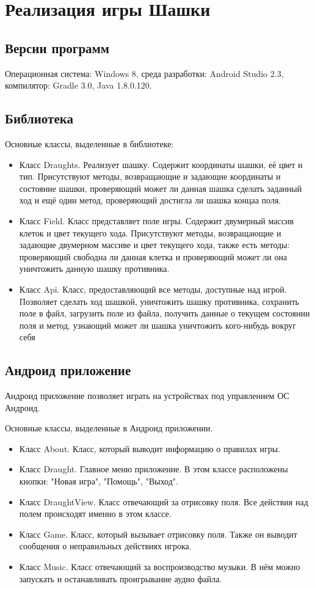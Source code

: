 \documentclass[a4paper]{article}
\begin{document}
\section{Реализация игры Шашки}
\subsection{Версии программ}
Операционная система: Windows 8, среда разработки: Android Studio 2.3, компилятор: Gradle 3.0, Java 1.8.0.120.

\subsection{Библиотека}
\noindent Основные классы, выделенные в библиотеке:
\begin{itemize}
\item Класс Draughts. Реализует шашку. Содержит координаты шашки, её цвет и тип. Присутствуют методы, возвращающие и задающие координаты и состояние шашки, проверяющий может ли данная шашка сделать заданный ход и ещё один метод, проверяющий достигла ли шашка концаа поля.
\item Класс Field. Класс представляет поле игры. Содержит двумерный массив клеток и цвет текущего хода. Присутствуют методы, возвращающие и задающие двумерном массиве и цвет текущего хода, также есть методы: проверяющий свободна ли данная клетка и проверяющий  может ли она уничтожить данную шашку противника.	
\item Класс Api. Класс, предоставляющий все методы, доступные над игрой. Позволяет сделать ход шашкой, уничтожить шашку противника, сохранить поле в файл, загрузить поле из файла, получить данные о текущем состоянии поля и метод, узнающий может ли шашка уничтожить кого-нибудь вокруг себя
\end{itemize}

\subsection{Андроид приложение}
Андроид приложение позволяет играть на устройствах под управлением ОС Андроид.

\noindent Основные классы, выделенные в Андроид приложении. 
\begin{itemize}
\item Класс About. Класс, который выводит информацию о правилах игры.
\item Класс Draught. Главное меню приложение. В этом классе расположены кнопки: "Новая игра", "Помощь", "Выход".
\item Класс DraughtView. Класс отвечающий за отрисовку поля. Все действия над полем происходят именно в этом классе.
\item Класс Game. Класс, который вызывает отрисовку поля. Также он выводит сообщения о неправильных действиях игрока.
\item Класс Music. Класс отвечающий за воспроизводство музыки. В нём можно запускать и останавливать проигрывание аудио файла.
\end{itemize}
\end{document}

